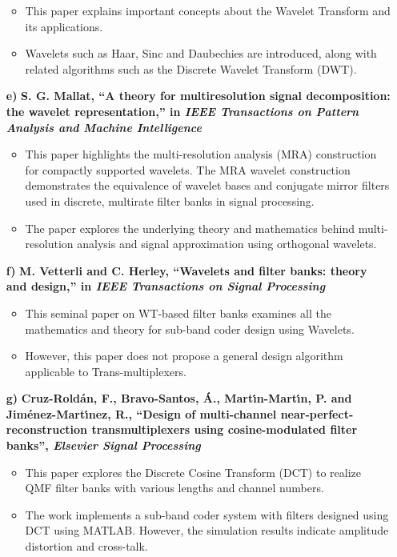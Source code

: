 \begin{enumerate}
\begin{itemize}
    \item This paper explains important concepts about the Wavelet Transform and its applications.
    \item Wavelets such as Haar, Sinc and Daubechies are introduced, along with related algorithms such as the Discrete Wavelet Transform (DWT).
\end{itemize}
\item[\textbf{e)}] \textbf{S. G. Mallat, ``A theory for multiresolution signal decomposition: the wavelet representation,'' in \textit{IEEE Transactions on Pattern Analysis and Machine Intelligence} \cite{mallat_paper}}
\begin{itemize}
    \item This paper highlights the multi-resolution analysis (MRA) construction for compactly supported wavelets. The MRA wavelet construction demonstrates the equivalence of wavelet bases and conjugate mirror filters used in discrete, multirate filter banks in signal processing.
    \item  The paper explores the underlying theory and mathematics behind multi-resolution analysis and signal  approximation using orthogonal wavelets.
\end{itemize}
\item[\textbf{f)}] \textbf{M. Vetterli and C. Herley, ``Wavelets and filter banks: theory and design,'' in \textit{IEEE Transactions on Signal Processing} \cite{b5}}
\begin{itemize}
    \item This seminal paper on WT-based filter banks examines all the mathematics and theory for sub-band coder design using Wavelets.
    \item However, this paper does not propose a general design algorithm applicable to Trans-multiplexers. 
\end{itemize}
\item[\textbf{g)}] \textbf{Cruz-Roldán, F., Bravo-Santos, Á., Martı́n-Martı́n, P. and Jiménez-Martı́nez, R., ``Design of multi-channel near-perfect-reconstruction transmultiplexers using cosine-modulated filter banks'', \textit{Elsevier Signal Processing} \cite{b6}}
\begin{itemize}
    \item This paper explores the Discrete Cosine Transform (DCT) to realize QMF filter banks with various lengths and channel numbers.
    \item The work implements a sub-band coder system with filters designed using DCT using MATLAB. However, the simulation results indicate amplitude distortion and cross-talk.
\end{itemize}


\end{enumerate}
